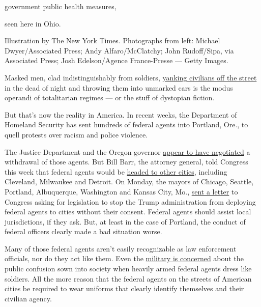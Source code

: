government public health measures,

seen here in Ohio.

Illustration by The New York Times. Photographs from left: Michael
Dwyer/Associated Press; Andy Alfaro/McClatchy; John Rudoff/Sipa, via
Associated Press; Josh Edelson/Agence France-Presse --- Getty Images.

Masked men, clad indistinguishably from soldiers,
\href{https://www.nytimes.com/2020/07/17/us/politics/federal-agents-portland-arrests.html}{yanking
civilians off the street} in the dead of night and throwing them into
unmarked cars is the modus operandi of totalitarian regimes --- or the
stuff of dystopian fiction.

But that's now the reality in America. In recent weeks, the Department
of Homeland Security has sent hundreds of federal agents into Portland,
Ore., to quell protests over racism and police violence.

The Justice Department and the Oregon governor
\href{https://www.nytimes.com/2020/07/29/us/protests-portland-federal-withdrawal.html?action=click\&module=Top\%20Stories\&pgtype=Homepage}{appear
to have negotiated} a withdrawal of those agents. But Bill Barr, the
attorney general, told Congress this week that federal agents would be
\href{https://www.nytimes.com/reuters/2020/07/29/us/politics/29reuters-global-race-protests.html}{headed
to other cities}, including Cleveland, Milwaukee and Detroit. On Monday,
the mayors of Chicago, Seattle, Portland, Albuquerque, Washington and
Kansas City, Mo.,
\href{https://www.npr.org/sections/live-updates-protests-for-racial-justice/2020/07/27/895904023/mayors-demand-congress-block-trump-from-deploying-federal-agents-to-cities}{sent
a letter} to Congress asking for legislation to stop the Trump
administration from deploying federal agents to cities without their
consent. Federal agents should assist local jurisdictions, if they ask.
But, at least in the case of Portland, the conduct of federal officers
clearly made a bad situation worse.

Many of those federal agents aren't easily recognizable as law
enforcement officials, nor do they act like them. Even the
\href{https://www.washingtonpost.com/national-security/2020/07/22/cbp-military-camouflage-uniforms/}{military
is concerned} about the public confusion sown into society when heavily
armed federal agents dress like soldiers. All the more reason that the
federal agents on the streets of American cities be required to wear
uniforms that clearly identify themselves and their civilian agency.

